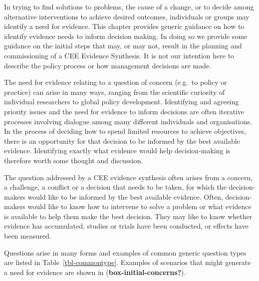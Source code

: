 \documentclass[
  letterpaper,
  DIV=11,
  numbers=noendperiod]{scrreprt}
\begin{document}
In trying to find solutions to problems, the cause of a change, or to
decide among alternative interventions to achieve desired outcomes,
individuals or groups may identify a need for evidence. This chapter
provides generic guidance on how to identify evidence needs to inform
decision making. In doing so we provide some guidance on the initial
steps that may, or may not, result in the planning and commissioning of
a CEE Evidence Synthesis. It is not our intention here to describe the
policy process or how management decisions are made.

The need for evidence relating to a question of concern (e.g.~to policy
or practice) can arise in many ways, ranging from the scientific
curiosity of individual researchers to global policy development.
Identifying and agreeing priority issues and the need for evidence to
inform decisions are often iterative processes involving dialogue among
many different individuals and organisations. In the process of deciding
how to spend limited resources to achieve objectives, there is an
opportunity for that decision to be informed by the best available
evidence. Identifying exactly what evidence would help decision-making
is therefore worth some thought and discussion.

The question addressed by a CEE evidence synthesis often arises from a
concern, a challenge, a conflict or a decision that needs to be taken,
for which the decision-makers would like to be informed by the best
available evidence. Often, decision-makers would like to know how to
intervene to solve a problem or what evidence is available to help them
make the best decision. They may like to know whether evidence has
accumulated, studies or trials have been conducted, or effects have been
measured.

Questions arise in many forms and examples of common generic question
types are listed in Table~\ref{tbl-commontype}. Examples of scenarios
that might generate a need for evidence are shown in
(\textbf{box-initial-concerns?}).
\end{document}
